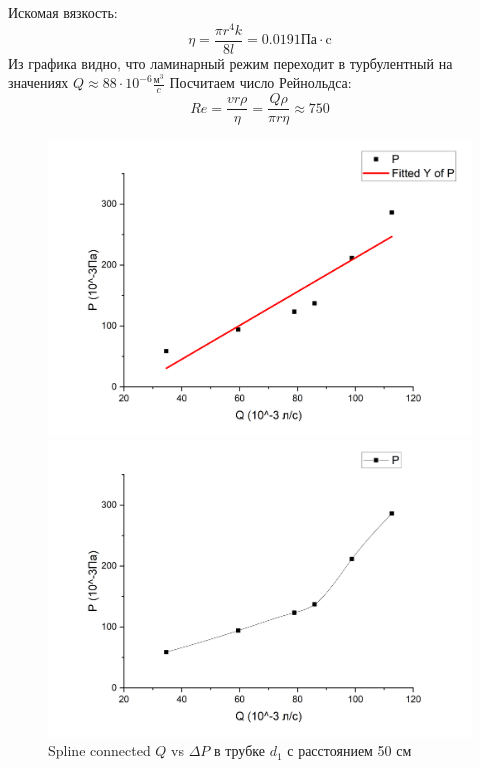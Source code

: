 \documentclass[a4paper, 12pt]{article}%
\begin{document}
Искомая вязкость:
\[
	\eta = \frac{\pi r^4 k}{8 l} = 0.0191 \text{Па} \cdot \text{c}
\]
Из графика видно, что ламинарный режим переходит в турбулентный на значениях $Q \approx 88 \cdot 10^{-6} \frac{\text{м}^3}{c}$
Посчитаем число Рейнольдса:
\[
	Re = \frac{vr\rho}{\eta} = 	\frac{Q \rho}{\pi r \eta} \approx  750
\]
\begin{figure}[h]
\center
\includegraphics[scale=0.4]{labphoto8.png}

\includegraphics[scale=0.4]{labphoto9.png}
\caption{Spline connected $Q$ vs $\Delta P$ в трубке $d_1$ с расстоянием 50 см}
\end{figure}
\newpage
\end{document}

